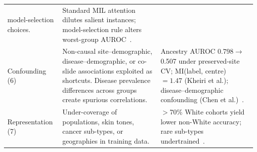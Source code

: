 \begin{table}[htbp]
\begin{tabularx}{\linewidth}{@{}p{2.3cm} X X@{}}
      model-selection choices. &
      Standard MIL attention dilutes salient instances; model-selection
      rule alters worst-group AUROC~\citep{ling2024agent,
      campanella2019clinical, zong2023medfair, cecconi2024fairness}. \\
    \addlinespace[2pt]
    Confounding (6) &
      Non-causal site--demographic, disease--demographic, or co-slide
      associations exploited as shortcuts. Disease prevalence differences
      across groups create spurious correlations. &
      Ancestry AUROC 0.798$\to$0.507 under preserved-site CV;
      MI(label, centre)~$=1.47$ (Kheiri et al.); disease--demographic
      confounding (Chen et al.)~\citep{howard2021site, chen2025predicting,
      kheiri2025investigation}. \\
    \addlinespace[2pt]
    Representation (7) &
      Under-coverage of populations, skin tones, cancer sub-types, or
      geographies in training data. &
      $>$70\% White cohorts yield lower non-White accuracy;
      rare sub-types undertrained~\citep{soltan2024challenges,
      vaidya2024demographic, ktena2024generative, tasci2022bias}. \\
    \bottomrule
  \end{tabularx}
\end{table}
